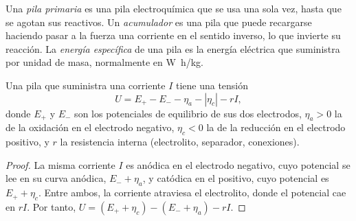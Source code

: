 \begin{definition}\label{def:b2:batteries-electrolysis:battery}
Una \emph{pila primaria} es una pila electroquímica que se usa
una sola vez, hasta que se agotan sus reactivos. Un \emph{acumulador}
es una pila que puede recargarse haciendo pasar a la fuerza una corriente en el
sentido inverso, lo que invierte su reacción. La \emph{energía
específica} de una pila es la energía eléctrica que suministra
por unidad de masa, normalmente en \unit{W.h/kg}.
\end{definition}

\begin{proposition}\label{prop:b2:batteries-electrolysis:delivering}
Una pila que suministra una corriente $I$ tiene una tensión
\[
  U = E_+ - E_- - \eta_a - |\eta_c| - rI ,
\]
donde $E_+$ y $E_-$ son los potenciales de equilibrio de sus dos electrodos,
$\eta_a > 0$ la  de la oxidación en el electrodo negativo,
$\eta_c < 0$ la de la reducción en el electrodo positivo, y $r$ la
resistencia interna (electrolito, separador, conexiones).
\end{proposition}

\begin{proof}
La misma corriente $I$ es anódica en el electrodo negativo, cuyo potencial se
lee en su curva anódica, $E_- + \eta_a$, y catódica en el positivo,
cuyo potencial es $E_+ + \eta_c$. Entre ambos, la corriente atraviesa el
electrolito, donde el potencial cae en $rI$. Por tanto, $U = (E_+ + \eta_c) - (E_- +
\eta_a) - rI$.
\end{proof}

